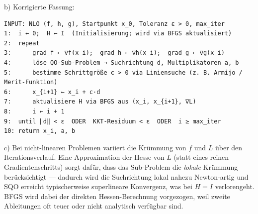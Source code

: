 \documentclass[11pt, a4paper]{article}
\begin{document}
b) Korrigierte Fassung:


\begin{lstlisting}
INPUT: NLO (f, h, g), Startpunkt x_0, Toleranz ε > 0, max_iter
1:  i ← 0;  H ← I  (Initialisierung; wird via BFGS aktualisiert)
2:  repeat
3:      grad_f ← ∇f(x_i);  grad_h ← ∇h(x_i);  grad_g ← ∇g(x_i)
4:      löse QO-Sub-Problem → Suchrichtung d, Multiplikatoren a, b
5:      bestimme Schrittgröße c > 0 via Liniensuche (z. B. Armijo / Merit-Funktion)
6:      x_{i+1} ← x_i + c·d
7:      aktualisiere H via BFGS aus (x_i, x_{i+1}, ∇L)
8:      i ← i + 1
9:  until ‖d‖ < ε  ODER  KKT-Residuum < ε  ODER  i ≥ max_iter
10: return x_i, a, b
\end{lstlisting}


c) Bei nicht-linearen Problemen variiert die Krümmung von $f$ und $L$ über den Iterationsverlauf. Eine Approximation der Hesse von $L$ (statt eines reinen Gradientenschritts) sorgt dafür, dass das Sub-Problem die \textit{lokale} Krümmung berücksichtigt — dadurch wird die Suchrichtung lokal nahezu Newton-artig und SQO erreicht typischerweise superlineare Konvergenz, was bei $H=I$ verlorengeht. BFGS wird dabei der direkten Hessen-Berechnung vorgezogen, weil zweite Ableitungen oft teuer oder nicht analytisch verfügbar sind.





\end{document}
